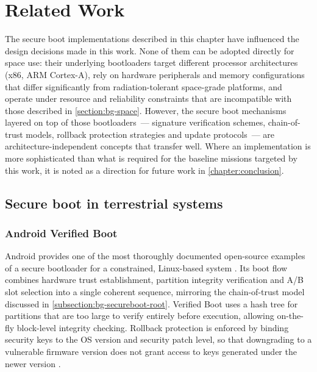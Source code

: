 \chapter{Related Work}
\label{chapter:related}

The secure boot implementations described in this chapter have influenced the design decisions made in this work. None of them can be adopted directly for space use: their underlying bootloaders target different processor architectures (x86, ARM Cortex-A), rely on hardware peripherals and memory configurations that differ significantly from radiation-tolerant space-grade platforms, and operate under resource and reliability constraints that are incompatible with those described in \autoref{section:bg-space}. However, the secure boot mechanisms layered on top of those bootloaders~--- signature verification schemes, chain-of-trust models, rollback protection strategies and update protocols~--- are architecture-independent concepts that transfer well. Where an implementation is more sophisticated than what is required for the baseline missions targeted by this work, it is noted as a direction for future work in \autoref{chapter:conclusion}.

\section{Secure boot in terrestrial systems}
\label{section:related-existing}

\subsection{Android Verified Boot}
\label{subsection:related-existing-android}

Android provides one of the most thoroughly documented open-source examples of a secure bootloader for a constrained, Linux-based system \cite{android_bootloader_2026}. Its boot flow combines hardware trust establishment, partition integrity verification and A/B slot selection into a single coherent sequence, mirroring the chain-of-trust model discussed in \autoref{subsection:bg-secureboot-root}. Verified Boot uses a hash tree for partitions that are too large to verify entirely before execution, allowing on-the-fly block-level integrity checking. Rollback protection is enforced by binding security keys to the OS version and security patch level, so that downgrading to a vulnerable firmware version does not grant access to keys generated under the newer version \cite{android_bootloader_2026}.

